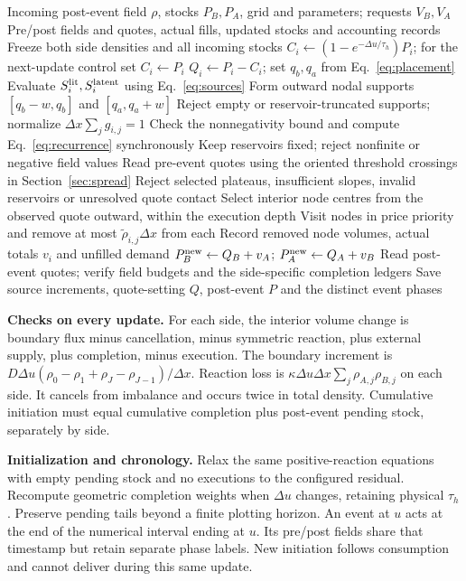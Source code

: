 \documentclass[11pt,a4paper]{article}
\newcommand{\du}{\Delta u}\newcommand{\dx}{\Delta x}\newcommand{\lap}{\delta_x^2}
\begin{document}
\begin{algorithm}[H]
\caption{Uniform-operational update with delayed opposite-side replenishment}\label{alg:markov}
\begin{algorithmic}[1]
\Require Incoming post-event field $\rho$, stocks $P_B,P_A$, grid and parameters; requests $V_B,V_A$
\Ensure Pre/post fields and quotes, actual fills, updated stocks and accounting records
\State Freeze both side densities and all incoming stocks
\State $C_i\gets(1-e^{-\du/\tau_h})P_i$; for the next-update control set $C_i\gets P_i$
\State $Q_i\gets P_i-C_i$; set $q_b,q_a$ from Eq.~\eqref{eq:placement}
\State Evaluate $S_i^{\rm lit},S_i^{\rm latent}$ using Eq.~\eqref{eq:sources}
\State Form outward nodal supports $[q_b-w,q_b]$ and $[q_a,q_a+w]$
\State Reject empty or reservoir-truncated supports; normalize $\dx\sum_jg_{i,j}=1$
\State Check the nonnegativity bound and compute Eq.~\eqref{eq:recurrence} synchronously
\State Keep reservoirs fixed; reject nonfinite or negative field values
\State Read pre-event quotes using the oriented threshold crossings in Section~\ref{sec:spread}
\State Reject selected plateaus, insufficient slopes, invalid reservoirs or unresolved quote contact
\State Select interior node centres from the observed quote outward, within the execution depth
\State Visit nodes in price priority and remove at most $\widetilde\rho_{i,j}\dx$ from each
\State Record removed node volumes, actual totals $v_i$ and unfilled demand
\EndFor
\State $P_B^{\rm new}\gets Q_B+v_A$; $P_A^{\rm new}\gets Q_A+v_B$
\State Read post-event quotes; verify field budgets and the side-specific completion ledgers
\State Save source increments, quote-setting $Q$, post-event $P$ and the distinct event phases
\end{algorithmic}
\end{algorithm}
\textbf{Checks on every update.} For each side, the interior volume change is
boundary flux minus cancellation, minus symmetric reaction, plus external
supply, plus completion, minus execution. The boundary increment is
$D\du(\rho_0-\rho_1+\rho_J-\rho_{J-1})/\dx$. Reaction loss is
$\kappa\du\dx\sum_j\rho_{A,j}\rho_{B,j}$ on each side. It cancels from
imbalance and occurs twice in total density. Cumulative initiation must equal
cumulative completion plus post-event pending stock, separately by side.

\textbf{Initialization and chronology.} Relax the same positive-reaction equations
with empty pending stock and no executions to the configured residual.
Recompute geometric completion weights when $\du$ changes, retaining physical
$\tau_h$. Preserve pending tails beyond a finite plotting horizon.
An event at $u$ acts at the end of the numerical interval ending at $u$. Its pre/post fields share that timestamp but retain separate phase labels. New initiation follows consumption and cannot deliver during this same update.
\end{document}
